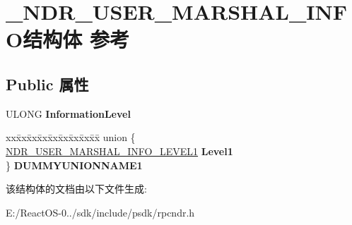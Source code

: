 \hypertarget{struct___n_d_r___u_s_e_r___m_a_r_s_h_a_l___i_n_f_o}{}\section{\+\_\+\+N\+D\+R\+\_\+\+U\+S\+E\+R\+\_\+\+M\+A\+R\+S\+H\+A\+L\+\_\+\+I\+N\+F\+O结构体 参考}
\label{struct___n_d_r___u_s_e_r___m_a_r_s_h_a_l___i_n_f_o}
\subsection*{Public 属性}
\begin{DoxyCompactItemize}
\item 
\mbox{\label{struct___n_d_r___u_s_e_r___m_a_r_s_h_a_l___i_n_f_o_ab4c69d6ccead1bc26abb0d9e9f501d05}} 
U\+L\+O\+NG {\bfseries Information\+Level}
\item 
\mbox{\label{struct___n_d_r___u_s_e_r___m_a_r_s_h_a_l___i_n_f_o_af274629ab772bda9cbe9ef7c14fa6e5c}} 
\begin{tabbing}
xx\=xx\=xx\=xx\=xx\=xx\=xx\=xx\=xx\=\kill
union \{\\
\>\hyperlink{struct___n_d_r___u_s_e_r___m_a_r_s_h_a_l___i_n_f_o___l_e_v_e_l1}{NDR\_USER\_MARSHAL\_INFO\_LEVEL1} {\bfseries Level1}\\
\} {\bfseries DUMMYUNIONNAME1}\\

\end{tabbing}\end{DoxyCompactItemize}


该结构体的文档由以下文件生成\+:\begin{DoxyCompactItemize}
\item 
E\+:/\+React\+O\+S-\/0../sdk/include/psdk/rpcndr.\+h\end{DoxyCompactItemize}
